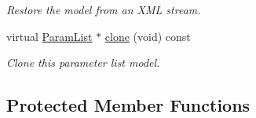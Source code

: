 \begin{DoxyCompactItemize}
\begin{DoxyCompactList}\small\item\em Restore the model from an X\+ML stream. \end{DoxyCompactList}\item 
virtual \mbox{\hyperlink{class_param_list}{Param\+List}} $\ast$ \mbox{\hyperlink{class_param_list_standard_a8257219823fdb31ac4aa59d2c0c640e5}{clone}} (void) const
\begin{DoxyCompactList}\small\item\em Clone this parameter list model. \end{DoxyCompactList}\end{DoxyCompactItemize}
\subsection*{Protected Member Functions}
